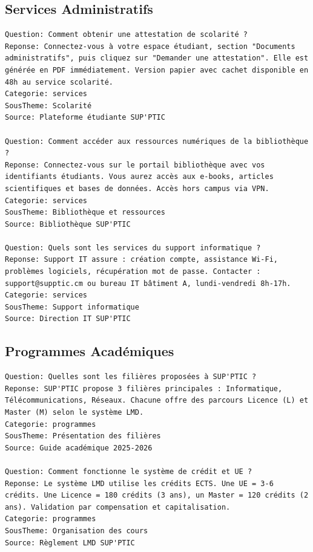 \documentclass[11pt,a4paper]{article}
\begin{document}
\subsection{Services Administratifs}
\begin{lstlisting}
Question: Comment obtenir une attestation de scolarité ?
Reponse: Connectez-vous à votre espace étudiant, section "Documents administratifs", puis cliquez sur "Demander une attestation". Elle est générée en PDF immédiatement. Version papier avec cachet disponible en 48h au service scolarité.
Categorie: services
SousTheme: Scolarité
Source: Plateforme étudiante SUP'PTIC

Question: Comment accéder aux ressources numériques de la bibliothèque ?
Reponse: Connectez-vous sur le portail bibliothèque avec vos identifiants étudiants. Vous aurez accès aux e-books, articles scientifiques et bases de données. Accès hors campus via VPN.
Categorie: services
SousTheme: Bibliothèque et ressources
Source: Bibliothèque SUP'PTIC

Question: Quels sont les services du support informatique ?
Reponse: Support IT assure : création compte, assistance Wi-Fi, problèmes logiciels, récupération mot de passe. Contacter : support@supptic.cm ou bureau IT bâtiment A, lundi-vendredi 8h-17h.
Categorie: services
SousTheme: Support informatique
Source: Direction IT SUP'PTIC
\end{lstlisting}

\subsection{Programmes Académiques}
\begin{lstlisting}
Question: Quelles sont les filières proposées à SUP'PTIC ?
Reponse: SUP'PTIC propose 3 filières principales : Informatique, Télécommunications, Réseaux. Chacune offre des parcours Licence (L) et Master (M) selon le système LMD.
Categorie: programmes
SousTheme: Présentation des filières
Source: Guide académique 2025-2026

Question: Comment fonctionne le système de crédit et UE ?
Reponse: Le système LMD utilise les crédits ECTS. Une UE = 3-6 crédits. Une Licence = 180 crédits (3 ans), un Master = 120 crédits (2 ans). Validation par compensation et capitalisation.
Categorie: programmes
SousTheme: Organisation des cours
Source: Règlement LMD SUP'PTIC
\end{lstlisting}
\end{document}
